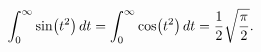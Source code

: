 \[\int_{0}^{\infty}\mathop{\sin\/}\nolimits\!\left(t^{2}\right)dt=\int_{0}^{%
\infty}\mathop{\cos\/}\nolimits\!\left(t^{2}\right)dt=\frac{1}{2}\sqrt{\frac{%
\pi}{2}}.\]
